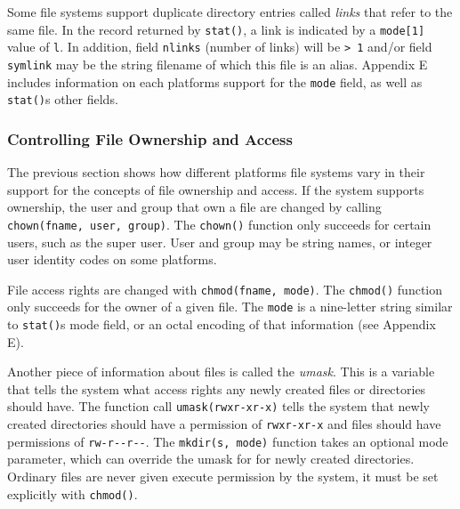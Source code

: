 Some file systems support duplicate directory entries called
\textit{links} that refer to the same file. In the record returned by
\texttt{stat()}, a link is indicated by a
\texttt{mode[1]} value of \texttt{{\textquotedbl}l{\textquotedbl}}. In
addition, field \texttt{nlinks} ({\textquotedbl}number of
links{\textquotedbl}) will be \texttt{{\textgreater} 1} and/or field
\texttt{symlink} may be the string filename of which this file is an
alias. Appendix E includes information on each
platform{\textquotesingle}s support for the \texttt{mode} field, as
well as \texttt{stat()}{\textquotesingle}s other fields.

\subsubsection[Controlling File Ownership and Access]{Controlling File
Ownership and Access}

The previous section shows how different
platforms{\textquotesingle} file systems vary in their support
for the concepts of file ownership and access. If the system supports
ownership, the user and group that own a file are changed by calling
\texttt{chown(fname, user, group)}. The \texttt{chown()}
function only succeeds for certain users, such as the super user.
User and group may be string names, or integer user identity codes on
some platforms.

File access rights are changed with \texttt{chmod(fname, mode)}. The
\texttt{chmod()} function only succeeds for the owner of a
given file. The \texttt{mode} is a nine-letter string similar to
\texttt{stat()}{\textquotesingle}s mode field, or an octal
encoding of that information (see Appendix E).

Another piece of information about files is called the
\textit{umask}. This is a variable that tells the system
what access rights any newly created files or directories should have.
The function call
\texttt{umask({\textquotedbl}rwxr-xr-x{\textquotedbl})} tells the
system that newly created directories should have a permission of
\texttt{{\textquotedbl}rwxr-xr-x{\textquotedbl}} and files should have
permissions of \texttt{{\textquotedbl}rw-r-{}-r-{}-{\textquotedbl}}.
The \texttt{mkdir(s, mode)} function takes an optional mode parameter,
which can override the umask for for newly created directories.
Ordinary files are never given execute permission by the system, it
must be set explicitly with \texttt{chmod()}.

